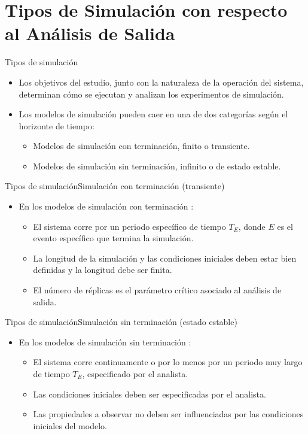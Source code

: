 \section[Tipos de Simulación]{Tipos de Simulación con respecto al Análisis de Salida}
\begin{frame}{Tipos de simulación}
    \begin{itemize}
        \item Los objetivos del estudio, junto con la naturaleza de la operación del sistema, determinan cómo se ejecutan y analizan los experimentos de simulación.
        \item Los modelos de simulación pueden caer en una de dos categorías según el horizonte de tiempo:\cite{BCN}
        \begin{itemize}
            \item Modelos de simulación con terminación, finito o transiente.
            \item Modelos de simulación sin terminación, infinito o de estado estable.
        \end{itemize}
    \end{itemize}
\end{frame}

\begin{frame}{Tipos de simulación}{Simulación con terminación (transiente)}
    \begin{itemize}
        \item En los modelos de simulación con terminación \cite{BCN}:
        \begin{itemize}
            \item El sistema corre por un periodo específico de tiempo $T_E$, donde $E$ es el evento específico que termina la simulación.
            \item La longitud de la simulación y las condiciones iniciales deben estar bien definidas y la longitud debe ser finita.
            \item El número de réplicas es el parámetro crítico asociado al análisis de salida.
        \end{itemize}
    \end{itemize}
\end{frame}

\begin{frame}{Tipos de simulación}{Simulación sin terminación (estado estable)}
    \begin{itemize}
        \item En los modelos de simulación sin terminación \cite{BCN}:
        \begin{itemize}
            \item El sistema corre continuamente o por lo menos por un periodo muy largo de tiempo $T_E$, especificado por el analista.
            \item Las condiciones iniciales deben ser especificadas por el analista.
            \item Las propiedades a observar no deben ser influenciadas por las condiciones iniciales del modelo.
        \end{itemize}
    \end{itemize}
\end{frame}